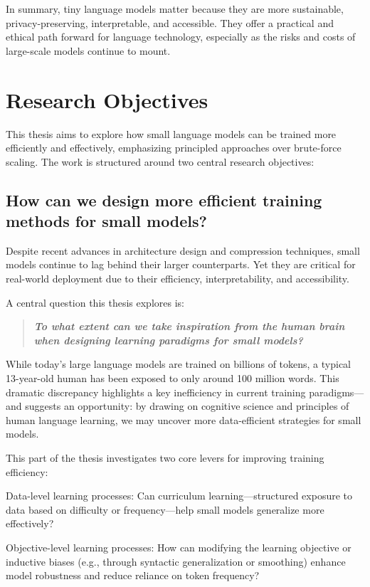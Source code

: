 In summary, tiny language models matter because they are more sustainable, privacy-preserving, interpretable, and accessible. They offer a practical and ethical path forward for language technology, especially as the risks and costs of large-scale models continue to mount.

\section*{Research Objectives}

This thesis aims to explore how small language models can be trained more efficiently and effectively, emphasizing principled approaches over brute-force scaling. The work is structured around two central research objectives:

\subsection{How can we design more efficient training methods for small models?}

Despite recent advances in architecture design and compression techniques, small models continue to lag behind their larger counterparts. Yet they are critical for real-world deployment due to their efficiency, interpretability, and accessibility.

A central question this thesis explores is:

\begin{quote}
    \textbf{\emph{To what extent can we take inspiration from the human brain when designing learning paradigms for small models?}}
\end{quote}

While today's large language models are trained on billions of tokens, a typical 13-year-old human has been exposed to only around 100 million words. This dramatic discrepancy highlights a key inefficiency in current training paradigms—and suggests an opportunity: by drawing on cognitive science and principles of human language learning, we may uncover more data-efficient strategies for small models.

This part of the thesis investigates two core levers for improving training efficiency:

Data-level learning processes: Can curriculum learning—structured exposure to data based on difficulty or frequency—help small models generalize more effectively?

Objective-level learning processes: How can modifying the learning objective or inductive biases (e.g., through syntactic generalization or smoothing) enhance model robustness and reduce reliance on token frequency?

